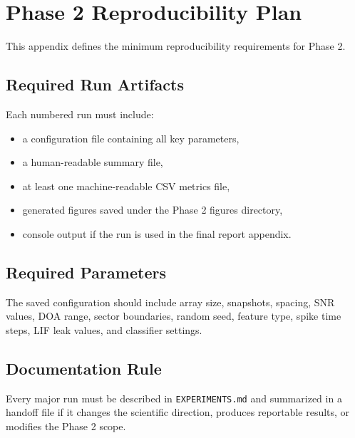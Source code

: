 \chapter{Phase 2 Reproducibility Plan}

This appendix defines the minimum reproducibility requirements for Phase 2.

\section{Required Run Artifacts}

Each numbered run must include:

\begin{itemize}
    \item a configuration file containing all key parameters,
    \item a human-readable summary file,
    \item at least one machine-readable CSV metrics file,
    \item generated figures saved under the Phase 2 figures directory,
    \item console output if the run is used in the final report appendix.
\end{itemize}

\section{Required Parameters}

The saved configuration should include array size, snapshots, spacing, SNR values, DOA range, sector boundaries, random seed, feature type, spike time steps, LIF leak values, and classifier settings.

\section{Documentation Rule}

Every major run must be described in \texttt{EXPERIMENTS.md} and summarized in a handoff file if it changes the scientific direction, produces reportable results, or modifies the Phase 2 scope.
